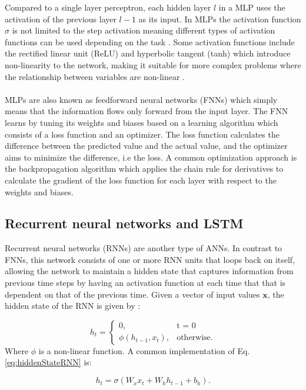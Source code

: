 Compared to a single layer perceptron, each hidden layer $l$ in a MLP uses the activation of the previous layer $l-1$ as its input. In MLPs the activation function $\sigma$ is not limited to the step activation meaning different types of activation functions can be used depending on the task \cite{goodfellow}. 
Some activation functions include the rectified linear unit (ReLU) and hyperbolic tangent (tanh) which introduce non-linearity to the network, making it suitable for more complex problems where the relationship between variables are non-linear \cite{goodfellow}. 
\\\\
MLPs are also known as feedforward neural networks (FNNs) which simply means that the information flows only forward from the input layer. The FNN learns by tuning its weights and biases based on a learning algorithm which consists of a loss function and an optimizer. The loss function calculates the difference between the predicted value and the actual value, and the optimizer aims to minimize the difference, i.e the loss. A common optimization approach is the backpropagation algorithm which applies the chain rule for derivatives to calculate the gradient of the loss function for each layer with respect to the weights and biases.

\subsection{Recurrent neural networks and LSTM}
Recurrent neural networks (RNNs) are another type of ANNs. In contrast to FNNs, this network consists of one or more RNN units that loops back on itself, allowing the network to maintain a hidden state that captures information from previous time steps by having an activation function at each time that that is dependent on that of the previous time. Given a vector of input values $\textbf{x}$, the hidden state of the RNN is given by \cite{rnnHiddenState}:

\begin{equation} \label{eq:hiddenStateRNN}
    h_{t} = 
    \begin{cases}
        0, & \text{t = 0} \\
        \phi(h_{t-1}, x_{t}), & \text{otherwise}.
    \end{cases}
\end{equation}
Where $\phi$ is a non-linear function. A common implementation of Eq. \ref{eq:hiddenStateRNN} is: 

\begin{equation}\label{eq:vanilla-rnn}
    h_{t} = \sigma(W_{x}x_{t} + W_{h}h_{t-1} + b_{h}).
\end{equation}

